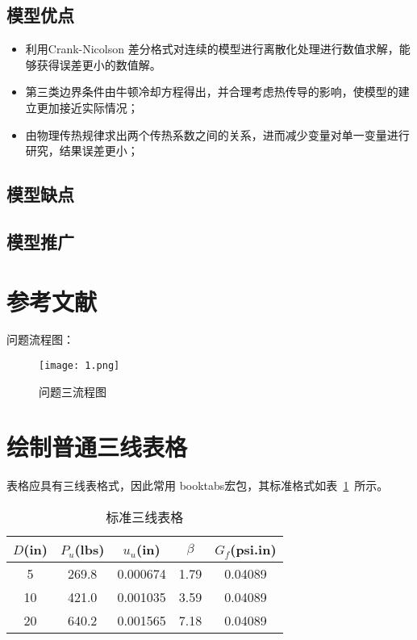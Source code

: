 \documentclass{cumcmthesis}
\begin{document}
    \subsection{模型优点} 
        \begin{itemize}
            \item 利用Crank-Nicolson 差分格式对连续的模型进行离散化处理进行数值求解，能够获得误差更小的数值解。
            \item 第三类边界条件由牛顿冷却方程得出，并合理考虑热传导的影响，使模型的建立更加接近实际情况；
            \item 由物理传热规律求出两个传热系数之间的关系，进而减少变量对单一变量进行研究，结果误差更小；
        \end{itemize}
    \subsection{模型缺点}
        
    \subsection{模型推广}
\section{参考文献}

问题流程图：
\begin{figure}[!h]
\centering
\texttt{[image: 1.png]}
\caption{问题三流程图}
\end{figure}

\section{绘制普通三线表格}
表格应具有三线表格式，因此常用 booktabs宏包，其标准格式如表~\ref{tab001}~所示。
\begin{table}[!htbp]
\caption{标准三线表格}\label{tab001} \centering
\begin{tabular}{ccccc}
\toprule[1.5pt]
$D$(in) & $P_u$(lbs) & $u_u$(in) & $\beta$ & $G_f$(psi.in)\\
\midrule[1pt]
 5 & 269.8 & 0.000674 & 1.79 & 0.04089\\
10 & 421.0 & 0.001035 & 3.59 & 0.04089\\
20 & 640.2 & 0.001565 & 7.18 & 0.04089\\
\bottomrule[1.5pt]
\end{tabular}
\end{table}
\end{document}
